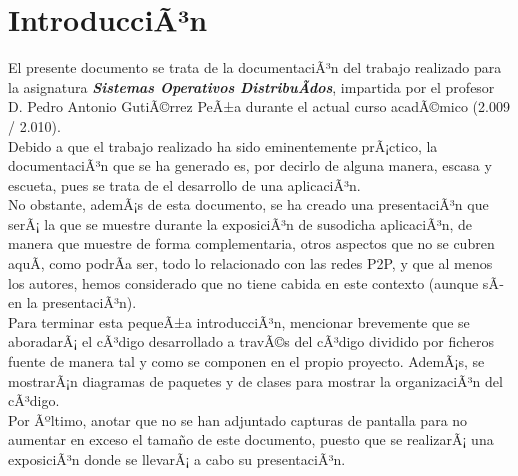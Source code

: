 \chapter{IntroducciÃ³n}
El presente documento se trata de la documentaciÃ³n del trabajo realizado para la asignatura \textbf{\textit{Sistemas Operativos DistribuÃ­dos}},
impartida por el profesor D. Pedro Antonio GutiÃ©rrez PeÃ±a durante el actual curso acadÃ©mico (2.009 / 2.010).\\

Debido a que el trabajo realizado ha sido eminentemente prÃ¡ctico, la documentaciÃ³n que se ha generado es, por decirlo de alguna manera, escasa y 
escueta, pues se trata de el desarrollo de una aplicaciÃ³n.\\

No obstante, ademÃ¡s de esta documento, se ha creado una presentaciÃ³n que serÃ¡ la que se muestre durante la exposiciÃ³n de susodicha aplicaciÃ³n, de
manera que muestre de forma complementaria, otros aspectos que no se cubren aquÃ­, como podrÃ­a ser, todo lo relacionado con las redes P2P, y que al
menos los autores, hemos considerado que no tiene cabida en este contexto (aunque sÃ­ en la presentaciÃ³n).\\

Para terminar esta pequeÃ±a introducciÃ³n, mencionar brevemente que se aboradarÃ¡ el cÃ³digo desarrollado a travÃ©s del cÃ³digo dividido por ficheros
fuente de manera tal y como se componen en el propio proyecto. AdemÃ¡s, se mostrarÃ¡n diagramas de paquetes y de clases para mostrar la organizaciÃ³n
del cÃ³digo.\\

Por Ãºltimo, anotar que no se han adjuntado capturas de pantalla para no aumentar en exceso el tamaño de este documento, puesto que se realizarÃ¡ una exposiciÃ³n donde
se llevarÃ¡ a cabo su presentaciÃ³n.


